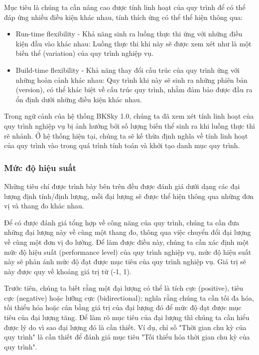 Mục tiêu là chúng ta cần nâng cao được tính linh hoạt của quy trình để có thể
đáp ứng nhiều điều kiện khác nhau, tính thích ứng có thể thể hiện thông qua:

\begin{itemize}
    \item Run-time flexibility - Khả năng sinh ra luồng thực thi ứng với những điều kiện
          đầu vào khác nhau: Luồng thực thi khi này sẽ được xem xét như là một biến thể
          (variation) của quy trình nghiệp vụ.

    \item Build-time flexibility - Khả năng thay đổi cấu trúc của quy trình ứng với những
          hoàn cảnh khác nhau: Quy trình khi này sẽ sinh ra những phiên bản (version), có
          thể khác biệt về cấu trúc quy trình, nhằm đảm bảo được đầu ra ổn định dưới
          những điều kiện khác nhau.
\end{itemize}

Trong ngữ cảnh của hệ thống BKSky 1.0, chúng ta đã xem xét tính linh hoạt của
quy trình nghiệp vụ bị ảnh hưởng bởi số lượng biến thể sinh ra khi luồng thực
thi rẽ nhánh. Ở hệ thống hiện tại, chúng ta sẽ kế thừa định nghĩa về tính linh hoạt của quy trình vào trong quá trình tính toán và khởi tạo danh mục quy trình.

\subsubsection{Mức độ hiệu suất}

Những tiêu chí được trình bày bên trên đều được đánh giá dưới dạng các đại lượng định tính/định lượng, mỗi đại lượng sẽ được thể hiện thông qua những đơn vị và thang đo khác nhau.

Để có được đánh giá tổng hợp về công năng của quy trình, chúng ta cần đưa những đại lượng này về cùng một thang đo, thông qua việc chuyển đổi đại lượng về cùng một đơn vị đo lường. Để làm được điều này, chúng ta cần xác định một mức độ hiệu suất (performance level) của quy trình nghiệp vụ, mức độ hiệu suất này sẽ phản ánh mức độ đạt được mục tiêu của quy trình nghiệp vụ. Giá trị sẽ này được quy về khoảng giá trị từ (-1, 1).

Trước tiên, chúng ta biết rằng một đại lượng có thể là tích cực (positive), tiêu cực (negative) hoặc lưỡng cực (bidirectional); nghĩa rằng chúng ta cần tối đa hóa, tối thiểu hóa hoặc cân bằng giá trị của đại lượng đó để mức độ đạt được mục tiêu của đại lượng tăng. Để làm rõ mục tiêu của đại lượng thì chúng ta cần hiểu được lý do vì sao đại lượng đó là cần thiết. Ví dụ, chỉ số "Thời gian chu kỳ của quy trình" là cần thiết để đánh giá mục tiêu "Tối thiểu hóa thời gian chu kỳ của quy trình".

